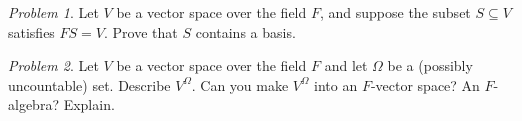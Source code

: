 \documentclass[11pt]{paper}
\theoremstyle{remark}
\newtheorem{problem}{Problem}
\newcommand\0{\ensuremath{\mathbf{0}}}
\newcommand{\<}{\ensuremath{\langle}}
\renewcommand{\>}{\ensuremath{\rangle}}
\begin{document}
\probskip

\begin{problem}  %
Let $V$ be a vector space over the field $F$, and suppose the subset 
$S \subseteq V$ satisfies $FS = V$. Prove that $S$ contains a basis.
\end{problem}

\probskip

\begin{problem}  %
Let $V$ be a vector space over the field $F$ and let $\Omega$ be a (possibly
uncountable) set.  Describe $V^\Omega$.  Can you make 
$V^\Omega$ into an  $F$-vector space?  An $F$-algebra? Explain.
\end{problem}
\end{document}
